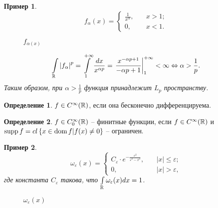 \documentclass[a5paper, 10pt]{article}
\theoremstyle{definition}
\newtheorem{Def}{Определение}
\theoremstyle{plain}
\newtheorem{Ex}{Пример}
\theoremstyle{remark}
\begin{document}
    \begin{Ex}
        \[
            f_{\alpha} (x) = \begin{cases}
            \frac{1}{x^{\alpha}}, \quad & x>1;\\
            0, \quad & x<1.
        \end{cases}
        \] 
        \begin{figure}[]
            \centering
            \caption{$f_{\alpha(x)}$}
            \label{}
        \end{figure}    

        \[
            \int\limits_{\mathbb{R}} \left|f_{\alpha}\right|^p = \int\limits_1^{+\infty} \frac{dx}{x^{\alpha p}} =\left. \frac{x^{-\alpha p + 1}}{-\alpha p + 1} \right|_1^{+\infty} < \infty \Leftrightarrow \alpha > \frac{1}{p}.
        \]
        Таким образом, при $\alpha > \frac{1}{p}$ функция принадлежит $L_p$ пространству.
    \end{Ex}

    \begin{Def}
        $f\in C^{\infty}(\mathbb{R})$, если она бесконечно дифференцируема.
    \end{Def}
    \begin{Def}
        $f\in C^{\infty}_0(\mathbb{R})$ -- финитные функции, если  $f\in C^\infty(\mathbb{R})$ и $\operatorname{supp} f = cl\left\{x\in \operatorname{dom} f | f(x) \neq 0\right\}$ -- ограничен.
    \end{Def}
    \begin{Ex}
        \[
            \omega_\varepsilon (x) = \begin{cases}
                C_\varepsilon \cdot e^{-\frac{\varepsilon^2}{\varepsilon^2-x^2}}, \quad & |x|\leqslant \varepsilon;\\
                    0, \quad & |x|>\varepsilon,
            \end{cases}
        \] 
        где константа $C_\varepsilon$ такова, что $\int\limits_{\mathbb{R}} \omega_\varepsilon(x)dx = 1$.
        \begin{figure}[h!]
            \centering
            \caption{$\omega_\varepsilon(x)$}
            \label{omega}
        \end{figure}
    \end{Ex}
\end{document}
